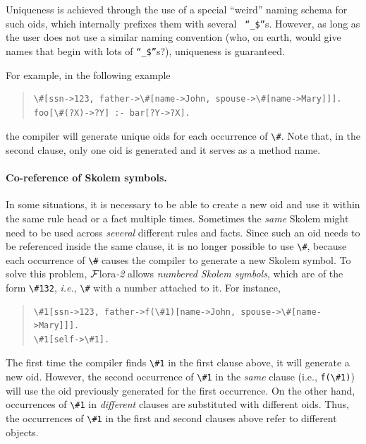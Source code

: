 \documentclass[11pt]{article}
\newcommand{\FLORA}{{\mbox{\sc ${\cal F}${lora}\rm\emph{-2}}}\xspace}
\newcommand{\FLSYSTEM}{\FLORA}
\newcommand{\bs}{\textbackslash}
\begin{document}
Uniqueness is achieved through the use of a special ``weird'' naming
schema for such oids, which internally prefixes them with several {\tt
  ``\_\$''}s. However, as long as the user does not use a similar
naming convention (who, on earth, would give names that begin with lots of
{\tt ``\_\$''}s?), uniqueness is guaranteed.


For example, in the following example
\begin{quote}
\begin{verbatim}
\#[ssn->123, father->\#[name->John, spouse->\#[name->Mary]]].
foo[\#(?X)->?Y] :- bar[?Y->?X].
\end{verbatim}
\end{quote}
the compiler will generate unique oids for each occurrence of {\tt \bs{}\#}.
Note that, in the second clause, only one oid is generated and it serves as
a method name.


\paragraph{Co-reference of Skolem symbols.}
In some situations, it is necessary to be able to create a new oid and use it
within the same rule head or a fact multiple times. Sometimes the \emph{same}
Skolem might need to be used across \emph{several} different rules and facts.
Since such an oid 
needs to be referenced inside the same  clause, it is no longer
possible to use \verb|\#|, because each occurrence of \verb|\#| causes the
compiler to generate a new Skolem symbol. To solve this problem, \FLSYSTEM allows 
\emph{numbered Skolem symbols}, which are of the form \verb|\#132|, {\it
  i.e.}, \verb|\#| with a number attached to it. For instance, 
\begin{quote}
\begin{verbatim}
\#1[ssn->123, father->f(\#1)[name->John, spouse->\#[name->Mary]]].
\#1[self->\#1].
\end{verbatim}
\end{quote}
The first time the compiler finds \verb|\#1| in the first clause above,
it will generate a new oid. However, the second occurrence of \verb|\#1|
in the \emph{same} clause (i.e., \verb|f(\#1)|)  will use the oid
previously generated for the first occurrence. On the other hand,
occurrences of \verb|\#1| in \emph{different} clauses are substituted with
different oids. Thus, the occurrences of \verb|\#1| in the first and second
clauses above refer to different objects.
\end{document}
